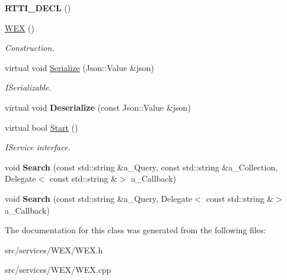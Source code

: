 \begin{DoxyCompactItemize}
\item 
\mbox{\label{class_w_e_x_a96b000812d930b59e818e62d43f142ed}} 
{\bfseries R\+T\+T\+I\+\_\+\+D\+E\+CL} ()
\item 
\mbox{\label{class_w_e_x_aa45dc4f9a13f11912690e420da8a1476}} 
\hyperlink{class_w_e_x_aa45dc4f9a13f11912690e420da8a1476}{W\+EX} ()
\begin{DoxyCompactList}\small\item\em Construction. \end{DoxyCompactList}\item 
\mbox{\label{class_w_e_x_a9e59fae8d9bdd17190eb02c433cf3c24}} 
virtual void \hyperlink{class_w_e_x_a9e59fae8d9bdd17190eb02c433cf3c24}{Serialize} (Json\+::\+Value \&json)
\begin{DoxyCompactList}\small\item\em I\+Serializable. \end{DoxyCompactList}\item 
\mbox{\label{class_w_e_x_a405efb08204e8108bc59c98ea8df1b98}} 
virtual void {\bfseries Deserialize} (const Json\+::\+Value \&json)
\item 
\mbox{\label{class_w_e_x_abb0df9ab15ce96a3293aa179abc54895}} 
virtual bool \hyperlink{class_w_e_x_abb0df9ab15ce96a3293aa179abc54895}{Start} ()
\begin{DoxyCompactList}\small\item\em I\+Service interface. \end{DoxyCompactList}\item 
\mbox{\label{class_w_e_x_a0a96e7d190c0ed65ec7670f5adef1ed0}} 
void {\bfseries Search} (const std\+::string \&a\+\_\+\+Query, const std\+::string \&a\+\_\+\+Collection, Delegate$<$ const std\+::string \&$>$ a\+\_\+\+Callback)
\item 
\mbox{\label{class_w_e_x_acd1fa8463d369ca81bb1cc3c7dd9858e}} 
void {\bfseries Search} (const std\+::string \&a\+\_\+\+Query, Delegate$<$ const std\+::string \&$>$ a\+\_\+\+Callback)
\end{DoxyCompactItemize}


The documentation for this class was generated from the following files\+:\begin{DoxyCompactItemize}
\item 
src/services/\+W\+E\+X/W\+E\+X.\+h\item 
src/services/\+W\+E\+X/W\+E\+X.\+cpp\end{DoxyCompactItemize}
